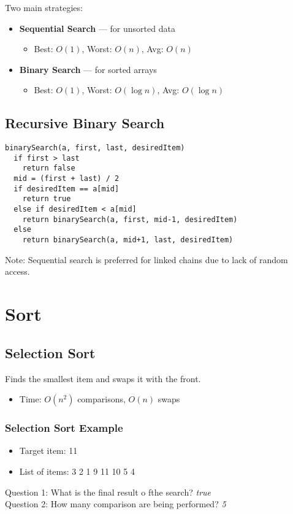 \documentclass[11pt]{article}
\begin{document}
Two main strategies:

\begin{itemize}
  \item \textbf{Sequential Search} — for unsorted data
    \begin{itemize}
      \item Best: $O(1)$, Worst: $O(n)$, Avg: $O(n)$
    \end{itemize}
  \item \textbf{Binary Search} — for sorted arrays
    \begin{itemize}
      \item Best: $O(1)$, Worst: $O(\log n)$, Avg: $O(\log n)$
    \end{itemize}
\end{itemize}

\subsection*{Recursive Binary Search}
\begin{verbatim}
binarySearch(a, first, last, desiredItem)
  if first > last
    return false
  mid = (first + last) / 2
  if desiredItem == a[mid]
    return true
  else if desiredItem < a[mid]
    return binarySearch(a, first, mid-1, desiredItem)
  else
    return binarySearch(a, mid+1, last, desiredItem)
\end{verbatim}

Note: Sequential search is preferred for linked chains due to lack of random access.

\hrulefill

\section*{Sort}

\subsection*{Selection Sort}
Finds the smallest item and swaps it with the front.

\begin{itemize}
  \item Time: $O(n^2)$ comparisons, $O(n)$ swaps
\end{itemize}

\subsubsection*{Selection Sort Example}
\begin{itemize}
    \item Target item: 11
    \item List of items: 3 2 1 9 11 10 5 4
\end{itemize}
Question 1: What is the final result o fthe search? \emph{true} \\
Question 2: How many comparison are being performed? \emph{5}
\end{document}
